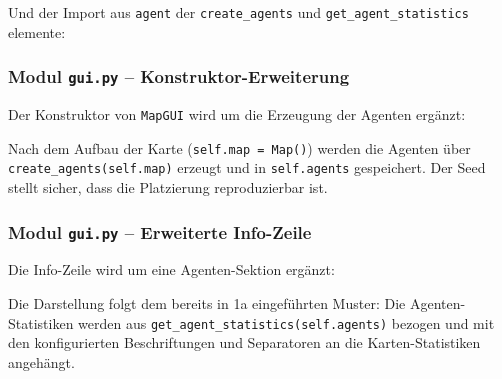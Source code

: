 

Und der Import aus \texttt{agent} der \texttt{create\_agents} und \texttt{get\_agent\_statistics} elemente:




\subsubsection{Modul \texttt{gui.py} – Konstruktor-Erweiterung}

Der Konstruktor von \texttt{Map\acs{GUI}} wird um die Erzeugung der Agenten ergänzt:



Nach dem Aufbau der Karte (\texttt{self.map = Map()}) werden die Agenten über \\ \texttt{create\_agents(self.map)} erzeugt und in \texttt{self.agents} gespeichert. Der Seed stellt sicher, dass die Platzierung reproduzierbar ist.


\subsubsection{Modul \texttt{gui.py} – Erweiterte Info-Zeile}

Die Info-Zeile wird um eine Agenten-Sektion ergänzt:



Die Darstellung folgt dem bereits in 1a eingeführten Muster: Die Agenten-Statistiken werden aus \texttt{get\_agent\_statistics(self.agents)} bezogen und mit den konfigurierten Beschriftungen und Separatoren an die Karten-Statistiken angehängt. 

